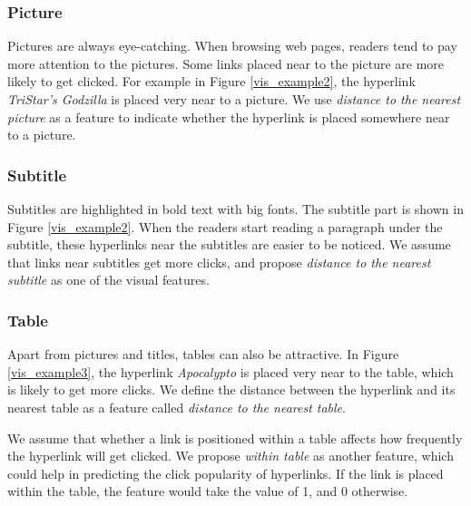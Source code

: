 \subsubsection{Picture}

Pictures are always eye-catching. When browsing web pages, readers tend to pay more attention to the pictures. Some links placed near to the picture are more likely to get clicked. For example in Figure \ref{vis_example2}, the hyperlink \emph{TriStar's Godzilla} is placed very near to a picture. We use \emph{distance to the nearest picture} as a feature to indicate whether the hyperlink is placed somewhere near to a picture.

\subsubsection{Subtitle}

Subtitles are highlighted in bold text with big fonts. The subtitle part is shown in Figure \ref{vis_example2}. When the readers start reading a paragraph under the subtitle, these hyperlinks near the subtitles are easier to be noticed. We assume that links near subtitles get more clicks, and propose \emph{distance to the nearest subtitle} as one of the visual features.
    
\subsubsection{Table}

Apart from pictures and titles, tables can also be attractive. In Figure \ref{vis_example3}, the hyperlink \emph{Apocalypto} is placed very near to the table, which is likely to get more clicks. We define the distance between the hyperlink and its nearest table as a feature called \emph{distance to the nearest table}.

We assume that whether a link is positioned within a table affects how frequently the hyperlink will get clicked. We propose \emph{within table} as another feature, which could help in predicting the click popularity of hyperlinks. If the link is placed within the table, the feature would take the value of 1, and 0 otherwise.

